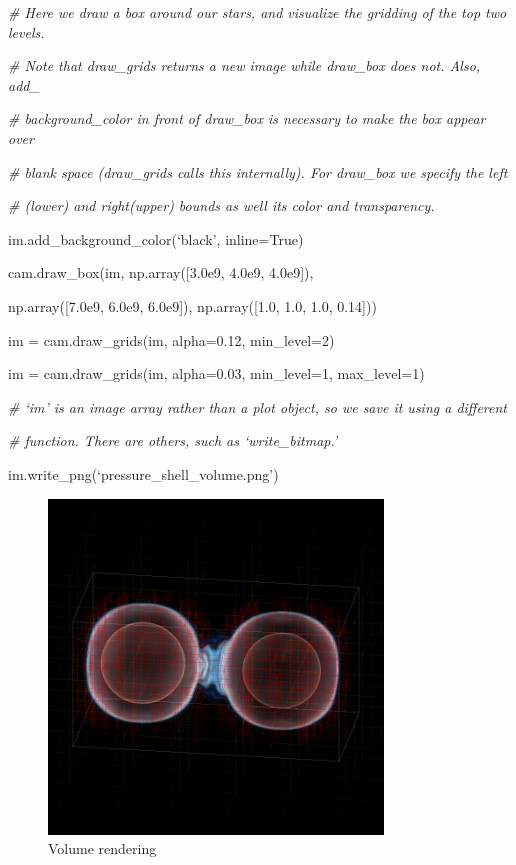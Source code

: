 {\it\# Here we draw a box around our stars, and visualize the gridding of the top two levels.}
{\setlength{\parskip}{0pt}

{\it\# Note that draw\_grids returns a new image while draw\_box does not. Also, add\_}

{\it\# background\_color in front of draw\_box is necessary to make the box appear over}

{\it\# blank space (draw\_grids calls this internally). For draw\_box we specify the left}

{\it\# (lower) and right(upper) bounds as well its color and transparency.}

im.add\_background\_color(`black', inline=True)
}

cam.draw\_box(im, np.array([3.0e9, 4.0e9, 4.0e9]),

{\setlength{\parindent}{72pt}np.array([7.0e9, 6.0e9, 6.0e9]), np.array([1.0, 1.0, 1.0, 0.14]))}

im = cam.draw\_grids(im, alpha=0.12, min\_level=2)

im = cam.draw\_grids(im, alpha=0.03, min\_level=1, max\_level=1)

{\it\# `im' is an image array rather than a plot object, so we save it using a different}
{\setlength{\parskip}{0pt}

{\it\# function. There are others, such as `write\_bitmap.'}

im.write\_png(`pressure\_shell\_volume.png')
}
\begin{figure}[h]
\centering
\includegraphics[width=3.5in]{Visualization/volume}
\caption{Volume rendering}
\end{figure}


